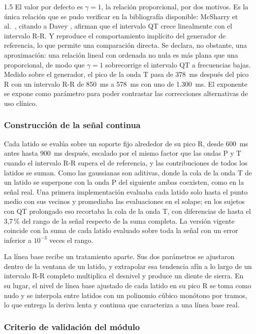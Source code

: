 \begin{spacing}{1.5}
El valor por defecto es $\gamma = 1$, la relación proporcional, por dos motivos.
Es la única relación que se pudo verificar en la bibliografía disponible:
McSharry et al.\ \cite{mcsharry2003dynamical}, citando a Davey
\cite{davey1999qt}, afirman que el intervalo QT crece linealmente con el
intervalo R-R. Y reproduce el comportamiento implícito del generador de
referencia, lo que permite una comparación directa. Se declara, no obstante, una
aproximación: una relación lineal con ordenada no nula es más plana que una
proporcional, de modo que $\gamma = 1$ sobrecorrige el intervalo QT a
frecuencias bajas. Medido sobre el generador, el pico de la onda T pasa de
378~ms después del pico R con un intervalo R-R de 850~ms a 578~ms con uno de
1.300~ms. El exponente se expone como parámetro para poder contrastar
las correcciones alternativas de uso clínico.

\subsubsection{Construcción de la señal continua}\label{sec:senal}

Cada latido se evalúa sobre un soporte fijo alrededor de su pico R, desde 600~ms
antes hasta 900~ms después, escalado por el mismo factor que las ondas P y T
cuando el intervalo R-R supera el de referencia, y las contribuciones de todos
los latidos se suman. Como las gaussianas son aditivas, donde la cola de la onda
T de un latido se superpone con la onda P del siguiente ambas coexisten, como en
la señal real. Una primera implementación evaluaba cada latido solo hasta el
punto medio con sus vecinos y promediaba las evaluaciones en el solape; en los
sujetos con QT prolongado eso recortaba la cola de la onda T, con diferencias de
hasta el 3,7\,\% del rango de la señal respecto de la suma completa. La versión
vigente coincide con la suma de cada latido evaluado sobre toda la señal con un
error inferior a $10^{-3}$ veces el rango.

La línea base recibe un tratamiento aparte. Sus dos parámetros se ajustaron
dentro de la ventana de un latido, y extrapolar esa tendencia afín a lo largo de
un intervalo R-R completo multiplica el desnivel y produce un diente de sierra.
En su lugar, el nivel de línea base ajustado de cada latido en su pico R se toma
como nudo y se interpola entre latidos con un polinomio cúbico monótono por
tramos, lo que entrega la deriva lenta y continua que caracteriza a una línea
base real.

\subsubsection{Criterio de validación del módulo}


\end{spacing}
